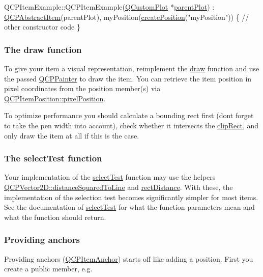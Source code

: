 \begin{DoxyCode}
QCPItemExample::QCPItemExample(\hyperlink{class_q_custom_plot}{QCustomPlot} *\hyperlink{class_q_c_p_layerable_ab7e0e94461566093d36ffc0f5312b109}{parentPlot}) :
  \hyperlink{class_q_c_p_abstract_item}{QCPAbstractItem}(parentPlot),
  myPosition(\hyperlink{class_q_c_p_abstract_item_a75036d39c4d4e2e1a7dd145fff915d32}{createPosition}(\textcolor{stringliteral}{"myPosition"}))
\{
  \textcolor{comment}{// other constructor code}
\}
\end{DoxyCode}
\hypertarget{class_q_c_p_abstract_item_items-drawing}{}\subsubsection{The draw function}\label{class_q_c_p_abstract_item_items-drawing}
To give your item a visual representation, reimplement the \hyperlink{class_q_c_p_abstract_item_a007fdab79c935a5da5aa04a21d268c18}{draw} function and use the passed \hyperlink{class_q_c_p_painter}{Q\+C\+P\+Painter} to draw the item. You can retrieve the item position in pixel coordinates from the position member(s) via \hyperlink{class_q_c_p_item_position_a8be9a4787635433edecc75164beb748d}{Q\+C\+P\+Item\+Position\+::pixel\+Position}.

To optimize performance you should calculate a bounding rect first (don\textquotesingle{}t forget to take the pen width into account), check whether it intersects the \hyperlink{class_q_c_p_abstract_item_a6ad60000f29afe11035e1f791dcbd45a}{clip\+Rect}, and only draw the item at all if this is the case.\hypertarget{class_q_c_p_abstract_item_items-selection}{}\subsubsection{The select\+Test function}\label{class_q_c_p_abstract_item_items-selection}
Your implementation of the \hyperlink{class_q_c_p_abstract_item_ae41d0349d68bb802c49104afd100ba2a}{select\+Test} function may use the helpers \hyperlink{class_q_c_p_vector2_d_a0f85a9c351640a4e0fc3c2a1a42d5d0c}{Q\+C\+P\+Vector2\+D\+::distance\+Squared\+To\+Line} and \hyperlink{class_q_c_p_abstract_item_a57cf4b9cecbfeb5f9e267481ecfe10cd}{rect\+Distance}. With these, the implementation of the selection test becomes significantly simpler for most items. See the documentation of \hyperlink{class_q_c_p_abstract_item_ae41d0349d68bb802c49104afd100ba2a}{select\+Test} for what the function parameters mean and what the function should return.\hypertarget{class_q_c_p_abstract_item_anchors}{}\subsubsection{Providing anchors}\label{class_q_c_p_abstract_item_anchors}
Providing anchors (\hyperlink{class_q_c_p_item_anchor}{Q\+C\+P\+Item\+Anchor}) starts off like adding a position. First you create a public member, e.\+g.


